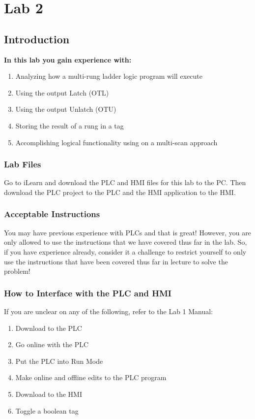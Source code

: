 \chapter{Lab 2}
\setcounter{TASignatures}{0}
\setcounter{AsideCounter}{0}

\section{Introduction}
    \vspace{0.1em}

    \textbf{In this lab you gain experience with:}
    \begin{enumerate}
        \item Analyzing how a multi-rung ladder logic program will execute
        \item Using the output Latch (OTL)
        \item Using the output Unlatch (OTU)
        \item Storing the result of a rung in a tag
        \item Accomplishing logical functionality using on a multi-scan approach
    \end{enumerate}

\subsection{Lab Files}

Go to iLearn and download the PLC and HMI files for this lab to the PC. Then download the PLC project to the PLC and the HMI application to the HMI. 

\subsection{Acceptable Instructions}

You may have previous experience with PLCs and that is great! However, you are only allowed to use the instructions that we have covered thus far in the lab. So, if you have experience already, consider it a challenge to restrict yourself to only use the instructions that have been covered thus far in lecture to solve the problem!

\subsection{How to Interface with the PLC and HMI}
\begin{samepage}
\noindent If you are unclear on any of the following, refer to the Lab 1 Manual:
\begin{enumerate}
    \item Download to the PLC
    \item Go online with the PLC
    \item Put the PLC into Run Mode
    \item Make online and offline edits to the PLC program
    \item Download to the HMI
    \item Toggle a boolean tag
\end{enumerate}

\end{samepage}

